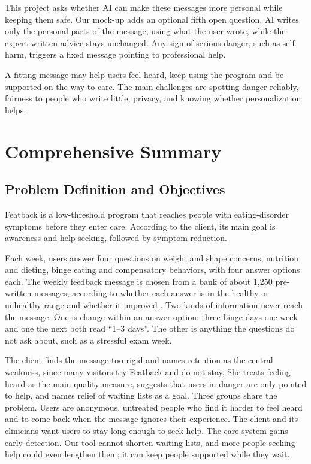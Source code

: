 \documentclass[a4paper]{article}
\begin{document}
This project asks whether AI can make these messages more personal while keeping them safe. Our mock-up adds an optional fifth open question. AI writes only the personal parts of the message, using what the user wrote, while the expert-written advice stays unchanged. Any sign of serious danger, such as self-harm, triggers a fixed message pointing to professional help.

A fitting message may help users feel heard, keep using the program and be supported on the way to care. The main challenges are spotting danger reliably, fairness to people who write little, privacy, and knowing whether personalization helps.

\newpage

\section{Comprehensive Summary} %

\subsection{Problem Definition and Objectives} 
Featback is a low-threshold program that reaches people with eating-disorder symptoms before they enter care. According to the client, its main goal is awareness and help-seeking, followed by symptom reduction. 

Each week, users answer four questions on weight and shape concerns, nutrition and dieting, binge eating and compensatory behaviors, with four answer options each. The weekly feedback message is chosen from a bank of about 1,250 pre-written messages, according to whether each answer is in the healthy or unhealthy range and whether it improved \citep{rohrbach2022featback, rohrbach2019protocol}. Two kinds of information never reach the message. One is change within an answer option: three binge days one week and one the next both read ``1--3 days''. The other is anything the questions do not ask about, such as a stressful exam week.

The client finds the message too rigid and names retention as the central weakness, since many visitors try Featback and do not stay. She treats feeling heard as the main quality measure, suggests that users in danger are only pointed to help, and names relief of waiting lists as a goal. Three groups share the problem. Users are anonymous, untreated people who find it harder to feel heard and to come back when the message ignores their experience. The client and its clinicians want users to stay long enough to seek help. The care system gains early detection. Our tool cannot shorten waiting lists, and more people seeking help could even lengthen them; it can keep people supported while they wait.
\end{document}
